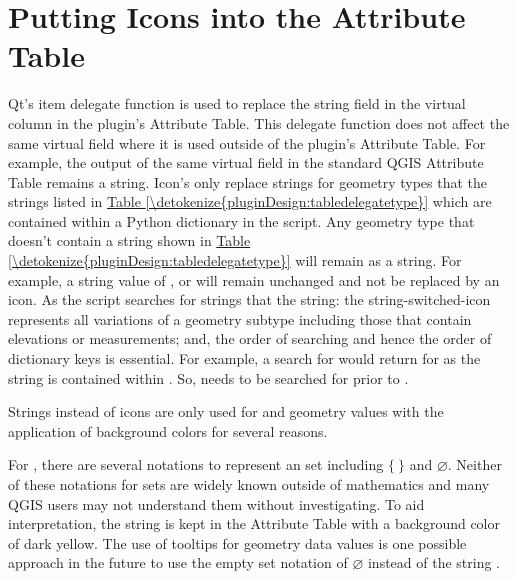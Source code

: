 \documentclass[a4paper,11pt,english]{sphinxmanual}
\begin{document}
\section{Putting Icons into the Attribute Table}
\label{\detokenize{pluginDesign:putting-icons-into-the-attribute-table}}
Qt’s item delegate function is used to replace the string field in the virtual  column in the plugin’s Attribute Table.  This delegate function does not affect the same virtual field where it is used outside of the plugin’s Attribute Table.  For example, the output of the same virtual field in the standard QGIS Attribute Table remains a string.  Icon’s only replace strings for geometry types that  the strings listed in \hyperref[\detokenize{pluginDesign:tabledelegatetype}]{Table \ref{\detokenize{pluginDesign:tabledelegatetype}}} which are contained within a Python dictionary in the script. Any geometry type that doesn’t contain a string shown in \hyperref[\detokenize{pluginDesign:tabledelegatetype}]{Table \ref{\detokenize{pluginDesign:tabledelegatetype}}} will remain as a string.  For example, a string value of ,  or  will remain unchanged and not be replaced by an icon.  As the script searches for strings that  the string: the string-switched-icon represents all variations of a geometry subtype including those that contain elevations or measurements; and, the order of searching and hence the order of dictionary keys is essential.  For example, a search for  would return  for  as the string  is contained within .  So,  needs to be searched for prior to .

Strings instead of icons are only used for  and  geometry values with the application of background colors for several reasons.

For , there are several notations to represent an  set including \(\{\ \}\) and \(\varnothing\).  Neither of these notations for  sets are widely known outside of mathematics and many QGIS users may not understand them without investigating.  To aid interpretation, the string  is kept in the Attribute Table with a background color of dark yellow.  The use of tooltips for  geometry data values is one possible approach in the future to use the empty set notation of \(\varnothing\) instead of the string .
\end{document}
